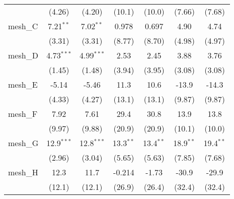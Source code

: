 \begin{tabular}{lcccccc}
                                                               & (4.26)         & (4.20)         & (10.1)         & (10.0)         & (7.66)        & (7.68)\\   
   mesh\_C                                                     & 7.21$^{**}$    & 7.02$^{**}$    & 0.978          & 0.697          & 4.90          & 4.74\\   
                                                               & (3.31)         & (3.31)         & (8.77)         & (8.70)         & (4.98)        & (4.97)\\   
   mesh\_D                                                     & 4.73$^{***}$   & 4.99$^{***}$   & 2.53           & 2.45           & 3.88          & 3.76\\   
                                                               & (1.45)         & (1.48)         & (3.94)         & (3.95)         & (3.08)        & (3.08)\\   
   mesh\_E                                                     & -5.14          & -5.46          & 11.3           & 10.6           & -13.9         & -14.3\\   
                                                               & (4.33)         & (4.27)         & (13.1)         & (13.1)         & (9.87)        & (9.87)\\   
   mesh\_F                                                     & 7.92           & 7.61           & 29.4           & 30.8           & 13.9          & 13.8\\   
                                                               & (9.97)         & (9.88)         & (20.9)         & (20.9)         & (10.1)        & (10.0)\\   
   mesh\_G                                                     & 12.9$^{***}$   & 12.8$^{***}$   & 13.3$^{**}$    & 13.4$^{**}$    & 18.9$^{**}$   & 19.4$^{**}$\\   
                                                               & (2.96)         & (3.04)         & (5.65)         & (5.63)         & (7.85)        & (7.68)\\   
   mesh\_H                                                     & 12.3           & 11.7           & -0.214         & -1.73          & -30.9         & -29.9\\   
                                                               & (12.1)         & (12.1)         & (26.9)         & (26.4)         & (32.4)        & (32.4)\\   

\end{tabular}
